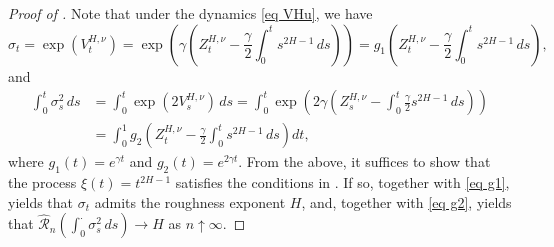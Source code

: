 \documentclass[12pt,reqno]{article}
\def\ua{\uparrow}
\def\wh{\widehat}
\numberwithin{equation}{section}
\def\cR{{\mathscr R}}
\theoremstyle{definition}
\def\ua{\uparrow}
\def\wh{\widehat}
\begin{document}
\begin{proof}[Proof of ]
	
	Note that under the dynamics \eqref{eq VHu}, we have
	\begin{equation}\label{eq g1}
		\sigma_t = \exp(V^{H,\nu}_t) = \exp\left(\gamma\left(Z^{H,\nu}_t - \frac{\gamma}{2}\int_0^t s^{2H-1}\, ds\right)\right) = g_1\left(Z^{H,\nu}_t - \frac{\gamma}{2}\int_0^t s^{2H-1}\, ds\right),
	\end{equation}
	and 
	\begin{equation}\label{eq g2}
		\begin{split}
			\int_0^t \sigma^2_s\,ds &= \int_0^t \exp(2V^{H,\nu}_s)\, ds = \int_0^t \exp\left(2\gamma\left(Z^{H,\nu}_s - \int_{0}^{t}\frac{\gamma}{2}s^{2H-1}\,ds\right)\right)\\ &= \int_0^1 g_2\left(Z^{H,\nu}_t - \frac{\gamma}{2}\int_0^t s^{2H-1}\, ds\right) dt,
		\end{split}
	\end{equation}
	where $g_1(t) = e^{\gamma t}$ and $g_2(t) = e^{2\gamma t}$. From the above, it suffices to show that the process $\xi(t) = t^{2H-1}$ satisfies the conditions in . If so, together with \eqref{eq g1},  yields that $\sigma_t$ admits the roughness exponent $H$, and, together with \eqref{eq g2},  yields that $\wh \cR_n(\int_{0}^{\cdot}\sigma^2_s\, ds) \rightarrow H$ as $n \ua \infty$.
	

\end{proof}
\end{document}
